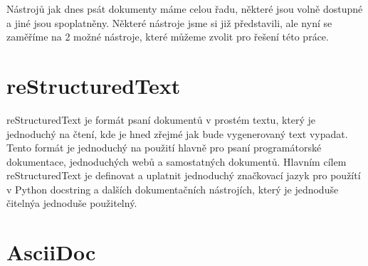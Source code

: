 Nástrojů jak dnes psát dokumenty máme celou řadu, některé jsou volně dostupné a jiné jsou spoplatněny. Některé nástroje jsme si již představili,
ale nyní se zaměříme na 2 možné nástroje, které můžeme zvolit pro řešení této práce.

\section{reStructuredText}

reStructuredText je formát psaní dokumentů v prostém textu, který je jednoduchý na čtení, kde je hned zřejmé jak bude vygenerovaný text vypadat.
Tento formát je jednoduchý na použití hlavně pro psaní programátorské dokumentace, jednoduchých webů a samostatných dokumentů.
Hlavním cílem reStructuredText je definovat a uplatnit jednoduchý značkovací jazyk pro použítí v Python docstring a dalších dokumentačních nástrojích,
který je jednoduše čitelnýa jednoduše použitelný. \cite{reStruDoc}


\section{AsciiDoc}